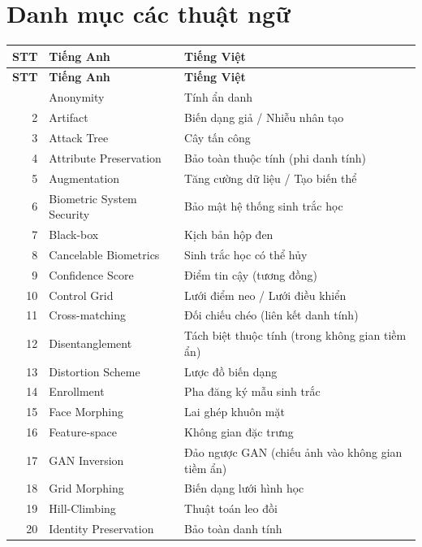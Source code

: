 \documentclass[oneside,a4paper,12pt]{extarticle}
\begin{document}
\clearpage
{}
\section*{Danh mục các thuật ngữ}

{\small
\renewcommand{\theHtable}{glossary.terms.\arabic{table}}
\begin{longtable}{r >{\raggedright\arraybackslash}p{5.2cm} >{\raggedright\arraybackslash}p{8.0cm}}
\toprule
\textbf{STT} & \textbf{Tiếng Anh} & \textbf{Tiếng Việt} \\
\midrule
\endfirsthead
\toprule
\textbf{STT} & \textbf{Tiếng Anh} & \textbf{Tiếng Việt} \\
\midrule
\endhead
\bottomrule
\endfoot
1 & Anonymity & Tính ẩn danh \\
2 & Artifact & Biến dạng giả / Nhiễu nhân tạo \\
3 & Attack Tree & Cây tấn công \\
4 & Attribute Preservation & Bảo toàn thuộc tính (phi danh tính) \\
5 & Augmentation & Tăng cường dữ liệu / Tạo biến thể \\
6 & Biometric System Security & Bảo mật hệ thống sinh trắc học \\
7 & Black-box & Kịch bản hộp đen \\
8 & Cancelable Biometrics & Sinh trắc học có thể hủy \\
9 & Confidence Score & Điểm tin cậy (tương đồng) \\
10 & Control Grid & Lưới điểm neo / Lưới điều khiển \\
11 & Cross-matching & Đối chiếu chéo (liên kết danh tính) \\
12 & Disentanglement & Tách biệt thuộc tính (trong không gian tiềm ẩn) \\
13 & Distortion Scheme & Lược đồ biến dạng \\
14 & Enrollment & Pha đăng ký mẫu sinh trắc \\
15 & Face Morphing & Lai ghép khuôn mặt \\
16 & Feature-space & Không gian đặc trưng \\
17 & GAN Inversion & Đảo ngược GAN (chiếu ảnh vào không gian tiềm ẩn) \\
18 & Grid Morphing & Biến dạng lưới hình học \\
19 & Hill-Climbing & Thuật toán leo đồi \\
20 & Identity Preservation & Bảo toàn danh tính \\

\end{longtable}}
\end{document}
